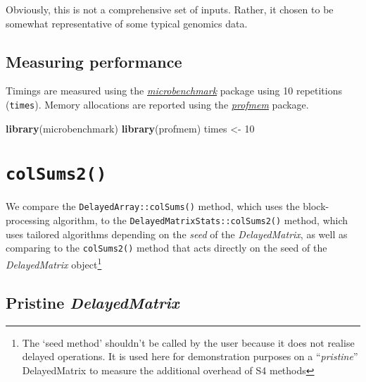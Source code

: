 \documentclass[]{book}
\newenvironment{Shaded}{\begin{snugshade}}{\end{snugshade}}
\newcommand{\KeywordTok}[1]{\textcolor[rgb]{0.13,0.29,0.53}{\textbf{#1}}}
\newcommand{\DecValTok}[1]{\textcolor[rgb]{0.00,0.00,0.81}{#1}}
\newcommand{\StringTok}[1]{\textcolor[rgb]{0.31,0.60,0.02}{#1}}
\newcommand{\NormalTok}[1]{#1}
\let\rmarkdownfootnote\footnote%
\def\footnote{\protect\rmarkdownfootnote}
\begin{document}
Obviously, this is not a comprehensive set of inputs. Rather, it chosen
to be somewhat representative of some typical genomics data.

\section{Measuring performance}\label{measuring-performance}

Timings are measured using the
\emph{\href{https://CRAN.R-project.org/package=microbenchmark}{microbenchmark}}
package using 10 repetitions (\texttt{times}). Memory allocations are
reported using the
\emph{\href{https://CRAN.R-project.org/package=profmem}{profmem}}
package.

\begin{Shaded}
\begin{Highlighting}[]
\KeywordTok{library}\NormalTok{(microbenchmark)}
\KeywordTok{library}\NormalTok{(profmem)}
\NormalTok{times <-}\StringTok{ }\DecValTok{10}
\end{Highlighting}
\end{Shaded}

\chapter{\texorpdfstring{\texttt{colSums2()}}{colSums2()}}\label{colsums2}

We compare the \texttt{DelayedArray::colSums()} method, which uses the
block-processing algorithm, to the
\texttt{DelayedMatrixStats::colSums2()} method, which uses tailored
algorithms depending on the \emph{seed} of the \emph{DelayedMatrix}, as
well as comparing to the \texttt{colSums2()} method that acts directly
on the seed of the \emph{DelayedMatrix} object\footnote{The `seed
  method' shouldn't be called by the user because it does not realise
  delayed operations. It is used here for demonstration purposes on a
  ``\emph{pristine}'' DelayedMatrix to measure the additional overhead
  of S4 methods}

\section{\texorpdfstring{Pristine
\emph{DelayedMatrix}}{Pristine DelayedMatrix}}\label{pristine-delayedmatrix}
\end{document}
